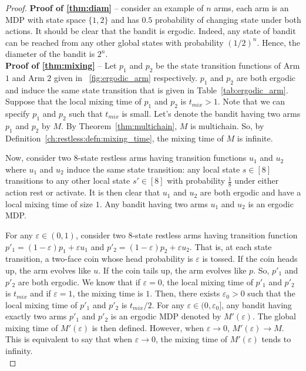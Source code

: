 \begin{proof}
    \textbf{Proof of \ref{thm:diam}} -- consider an example of $n$ arms, each arm is an MDP with state space $\{1,2\}$ and has $0.5$ probability of changing state under both actions.
    It should be clear that the bandit is ergodic.
    Indeed, any state of bandit can be reached from any other global states with probability $(1/2)^n$.
    Hence, the diameter of the bandit is $2^n$.
    \medskip \\

    \textbf{Proof of \ref{thm:mixing}} -- Let $p_1$ and $p_2$ be the state transition functions of Arm $1$ and Arm $2$ given in \figurename~\ref{fig:ergodic_arm} respectively.
    $p_1$ and $p_2$ are both ergodic and induce the same state transition that is given in Table~\ref{tab:ergodic_arm}.
    Suppose that the local mixing time of $p_1$ and $p_2$ is $t_{mix}>1$.
    Note that we can specify $p_1$ and $p_2$ such that $t_{mix}$ is small.
    Let's denote the bandit having two arms $p_1$ and $p_2$ by $M$.
    By Theorem~\ref{thm:multichain}, $M$ is multichain.
    So, by Definition~\ref{ch:restless:defn:mixing_time}, the mixing time of $M$ is infinite.

    Now, consider two 8-state restless arms having transition functions $u_1$ and $u_2$ where $u_1$ and $u_2$ induce the same state transition: any local state $s\in[8]$ transitions to any other local state $s'\in[8]$ with probability $\frac18$ under either action rest or activate.
    It is then clear that $u_1$ and $u_2$ are both ergodic and have a local mixing time of size $1$.
    Any bandit having two arms $u_1$ and $u_2$ is an ergodic MDP.

    For any $\varepsilon\in(0,1)$, consider two 8-state restless arms having transition function $p'_1=(1-\varepsilon)p_1+\varepsilon u_1$ and $p'_2=(1-\varepsilon)p_2+\varepsilon u_2$.
    That is, at each state transition, a two-face coin whose head probability is $\varepsilon$ is tossed.
    If the coin heads up, the arm evolves like $u$.
    If the coin tails up, the arm evolves like $p$.
    So, $p'_1$ and $p'_2$ are both ergodic.
    We know that if $\varepsilon=0$, the local mixing time of $p'_1$ and $p'_2$ is $t_{mix}$ and if $\varepsilon=1$, the mixing time is $1$.
    Then, there exists $\varepsilon_0>0$ such that the local mixing time of $p'_1$ and $p'_2$ is $t_{mix}/2$.
    For any $\varepsilon\in(0,\varepsilon_0]$, any bandit having exactly two arms $p'_1$ and $p'_2$ is an ergodic MDP denoted by $M'(\varepsilon)$.
    The global mixing time of $M'(\varepsilon)$ is then defined.
    However, when $\varepsilon\to0$, $M'(\varepsilon)\to M$.
    This is equivalent to say that when $\varepsilon\to0$, the mixing time of $M'(\varepsilon)$ tends to infinity.
    \medskip \\


\end{proof}
